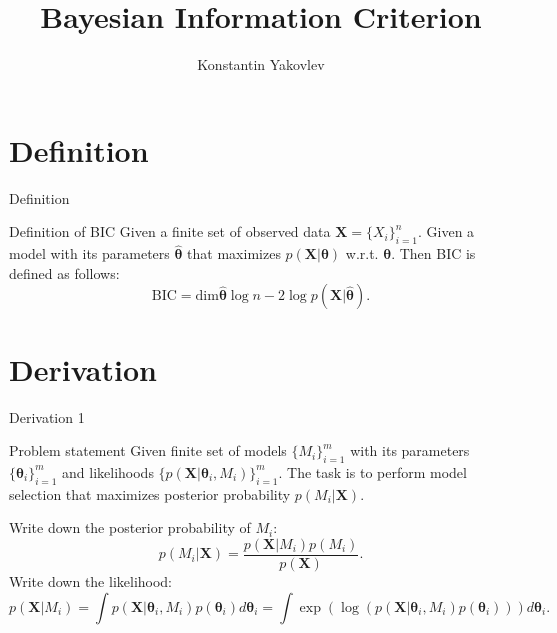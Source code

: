 \documentclass{beamer}
\title{Bayesian Information Criterion}
\author{Konstantin Yakovlev}
\institute{MIPT, 2022}
\begin{document}
\begin{frame}
    \titlepage
\end{frame}


\begin{frame}
    \tableofcontents
\end{frame}


\section{Definition}
\begin{frame}{Definition}
    \begin{block}{Definition of BIC}
        Given a finite set of observed data $\mathbf{X} = \{X_i\}_{i=1}^n$. Given a model with its
        parameters $\hat{\boldsymbol\theta}$ that maximizes $p(\mathbf{X}|\boldsymbol\theta)$ w.r.t.
        $\boldsymbol\theta$.
        Then BIC is defined as follows:
        \[
            \mathrm{BIC} = \mathrm{dim}\hat{\boldsymbol\theta}\log n -
            2\log p(\mathbf{X}|\hat{\boldsymbol\theta}).
        \]
    \end{block}
\end{frame}


\section{Derivation}
\begin{frame}{Derivation 1}
    \begin{block}{Problem statement}
        Given finite set of models $\{M_i\}_{i=1}^m$ with its parameters $\{\boldsymbol\theta_i\}_{i=1}^m$
        and likelihoods $\{p(\mathbf{X}|\boldsymbol\theta_i, M_i)\}_{i=1}^m$.
        The task is to perform model selection that maximizes posterior probability $p(M_i|\mathbf{X})$.
    \end{block}

    Write down the posterior probability of $M_i$:
    \[
        p(M_i|\mathbf{X}) = \frac{p(\mathbf{X}|M_i)p(M_i)}{p(\mathbf{X})}.
    \]
    Write down the likelihood:
    \[
        p(\mathbf{X}|M_i) = \int p(\mathbf{X}| \boldsymbol\theta_i, M_i)p(\boldsymbol\theta_i)
        d\boldsymbol\theta_i =
        \int \exp(\log(p(\mathbf{X}|\boldsymbol\theta_i, M_i)p(\boldsymbol\theta_i)))d\boldsymbol\theta_i.
    \]
\end{frame}
\end{document}
